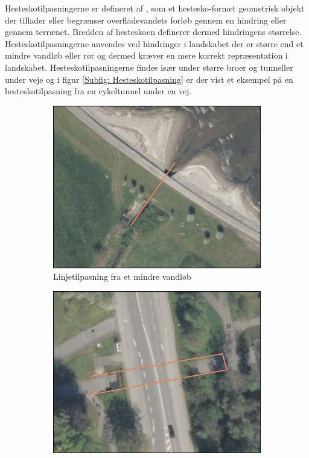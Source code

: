 Hesteskotilpasningerne er defineret af \cite{DHM_Hestesko}, som et hestesko-formet geometrisk objekt der tillader eller begrænser overfladevandets forløb gennem en hindring eller gennem terrænet. Bredden af hesteskoen definerer dermed hindringens størrelse. Hesteskotilpasningerne anvendes ved hindringer i landskabet der er større end et mindre vandløb eller rør og dermed kræver en mere korrekt repræsentation i landskabet. Hesteskotilpasningerne findes især under større broer og tunneller under veje og i figur \ref{Subfig: Hesteskotilpasning} er der vist et eksempel på en hesteskotilpasning fra en cykeltunnel under en vej.
\begin{figure}[H]
    \begin{subfigure}[b]{0.5\textwidth}
        \centering
        \includegraphics[width=1\linewidth]{images/databeskrivelse/linje.jpg}
        \caption{Linjetilpasning fra et mindre vandløb}
        \label{Subfig: Linjetilpasning}
    \end{subfigure}
    \hspace{0.2cm}
    \begin{subfigure}[b]{0.5\textwidth}
        \centering
        \includegraphics[width=1\linewidth]{images/databeskrivelse/hestesko.jpg}

\end{subfigure}
\end{figure}
